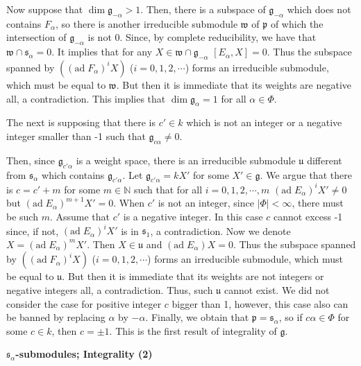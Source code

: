 \documentclass{article}
\newcommand{\NaN}{\mathbb{N}}
\newcommand{\lie}[1]{\mathfrak{#1}}
\newcommand{\ad}[1]{\mathrm{ad}\; #1}
\begin{document}
Now suppose that $\dim{\lie{g}_{-\alpha}} > 1$.
Then, there is a subspace of $\lie{g}_{-\alpha}$ which does not contains $F_\alpha$, so there is another irreducible submodule $\lie{w}$ of $\lie{p}$ of which the intersection of $\lie{g}_{-\alpha}$ is not 0.
Since, by complete reducibility, we have that $\lie{w} \cap \lie{s}_\alpha = 0$.
It implies that for any $X \in \lie{w} \cap \lie{g}_{-\alpha}$ $[E_\alpha, X] = 0$.
Thus the subspace spanned by $((\ad{F_\alpha})^i X)$ ($i = 0, 1, 2, \cdots$) forms an irreducible submodule, which must be equal to $\lie{w}$.
But then it is immediate that its weights are negative all, a contradiction.
This implies that $\dim{\lie{g}_\alpha} = 1$ for all $\alpha \in \Phi$.


The next is supposing that there is  $c' \in k$ which is not an integer or a negative integer smaller than -1 such that $\lie{g}_{c\alpha} \ne 0$.

Then, since $\lie{g}_{c'\alpha}$ is a weight space, there is an irreducible submodule $\lie{u}$ different from $\lie{s}_\alpha$ which contains $\lie{g}_{c'\alpha}$.
Let $\lie{g}_{c'\alpha} = kX'$ for some $X' \in \lie{g}$.
We argue that there is $c = c' + m$ for some $m \in \NaN$ such that for all $i = 0, 1, 2, \cdots, m$ $(\ad{E_\alpha})^i X' \ne 0$ but $(\ad{E_\alpha})^{m + 1} X' = 0$.
When $c'$ is not an integer, since $|\Phi| < \infty$, there must be such $m$.
Assume that $c'$ is a negative integer.
In this case $c$ cannot excess -1 since, if not, $(\ad{E_\alpha})^i X'$ is in $\lie{s}_1$, a contradiction.
Now we denote $X = (\ad{E_\alpha})^m X'$.
Then $X \in \lie{u}$ and $(\ad{E_\alpha})X = 0$.
Thus the subspace spanned by $((\ad{F_\alpha})^i X)$ ($i = 0, 1, 2, \cdots$) forms an irreducible submodule, which must be equal to $\lie{u}$.
But then it is immediate that its weights are not integers or negative integers all, a contradiction.
Thus, such $\lie{u}$ cannot exist.
We did not consider the case for positive integer $c$ bigger than 1, however, this case also can be banned by replacing $\alpha$ by $-\alpha$.
Finally, we obtain that $\lie{p} = \lie{s}_\alpha$, so if $c\alpha \in \Phi$ for some $c \in k$, then $c = \pm 1$.
This is the first result of integrality of $\lie{g}$.

\newpage

\textbf{$\lie{s}_\alpha$-submodules; Integrality (2)}
\end{document}

